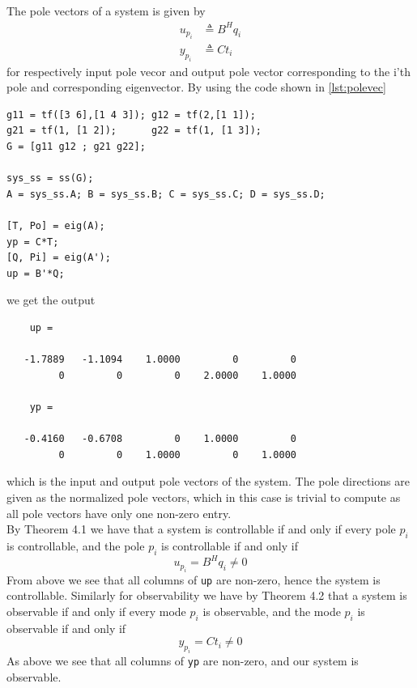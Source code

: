 \documentclass[a4paper]{scrartcl}
\begin{document}
\subsection{}
The pole vectors of a system is given by
\begin{equation}
	\begin{aligned}
		u_{p_i} &\triangleq B^H q_i\\
		y_{p_i} &\triangleq C t_i
	\end{aligned}
\end{equation}
for respectively input pole vecor and output pole vector corresponding to the i'th pole and corresponding eigenvector. By using the code shown in \autoref{lst:polevec}
\begin{lstlisting}[style=Matlab-editor, caption=Matlab code to generate pole vectors, label={lst:polevec}]
g11 = tf([3 6],[1 4 3]); g12 = tf(2,[1 1]);
g21 = tf(1, [1 2]);      g22 = tf(1, [1 3]);
G = [g11 g12 ; g21 g22];

sys_ss = ss(G);
A = sys_ss.A; B = sys_ss.B; C = sys_ss.C; D = sys_ss.D;

[T, Po] = eig(A);
yp = C*T;
[Q, Pi] = eig(A');
up = B'*Q;
\end{lstlisting}
we get the output
{\small \begin{verbatim}
	up =

   -1.7889   -1.1094    1.0000         0         0
         0         0         0    2.0000    1.0000

    yp =

   -0.4160   -0.6708         0    1.0000         0
         0         0    1.0000         0    1.0000
\end{verbatim}
}
which is the input and output pole vectors of the system. The pole directions are given as the normalized pole vectors, which in this case is trivial to compute as all pole vectors have only one non-zero entry. \\
By Theorem 4.1 we have that a system is controllable if and only if every pole $p_i$ is controllable, and the pole $p_i$ is controllable if and only if
\begin{equation}
	u_{p_i} = B^H q_i \neq 0
\end{equation}
From above we see that all columns of \texttt{up} are non-zero, hence the system is controllable. Similarly for observability we have by Theorem 4.2 that a system is observable if and only if every mode $p_i$ is observable, and the mode $p_i$ is observable if and only if 
\begin{equation}
	y_{p_i} = Ct_i \neq 0
\end{equation}
As above we see that all columns of \texttt{yp} are non-zero, and our system is observable.
\end{document}
